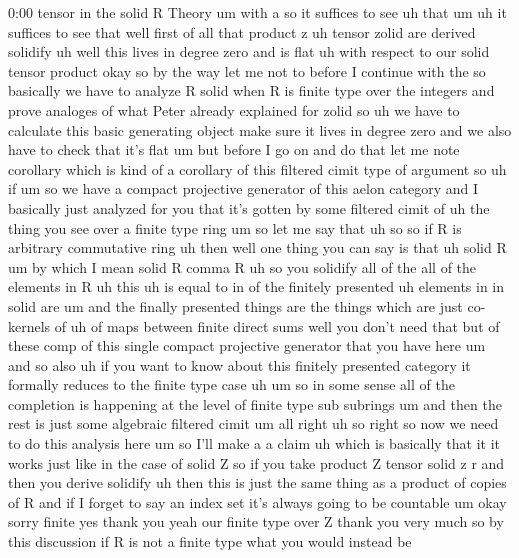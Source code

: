 \begin{unfinished}{0:00}
tensor  in  the  solid  R  Theory  um  with
a  so  it  suffices  to
see  uh  that
um  uh  it  suffices  to  see  that  well  first
of  all  that  product  z  uh  tensor  zolid
are  derived
solidify  uh  well  this  lives  in  degree
zero  and  is
flat  uh  with  respect  to  our  solid  tensor
product
okay
so  by  the  way  let  me  not  to  before  I
continue  with  the  so  basically  we  have
to  analyze  R  solid  when  R  is  finite  type
over  the  integers  and  prove  analoges  of
what  Peter  already  explained  for  zolid
so  uh  we  have  to  calculate  this  basic
generating  object  make  sure  it  lives  in
degree  zero  and  we  also  have  to  check
that  it's  flat  um  but  before  I  go  on  and
do  that  let  me  note  corollary  which  is
kind  of  a  corollary  of  this  filtered
cimit  type  of  argument  so  uh  if  um  so  we
have  a  compact  projective  generator  of
this  aelon  category  and  I  basically  just
analyzed  for  you  that  it's  gotten  by
some  filtered  cimit  of  uh  the  thing  you
see  over  a  finite  type  ring  um  so  let  me
say  that  uh  so  so  if  R  is
arbitrary  commutative  ring
uh  then  well  one  thing  you  can  say  is
that  uh  solid
R  um  by  which  I  mean  solid  R  comma
R  uh  so  you  solidify  all  of  the  all  of
the  elements  in  R  uh  this  uh  is  equal  to
in  of  the  finitely  presented
uh  elements  in  in  solid  are  um  and  the
finally  presented  things  are  the  things
which  are  just  co-  kernels  of  uh  of  maps
between  finite  direct  sums  well  you
don't  need  that  but  of  these  comp  of
this  single  compact  projective  generator
that  you  have  here  um  and  so
also  uh  if  you  want  to  know  about  this
finitely  presented  category  it  formally
reduces  to  the  finite  type
case  uh
um  so  in  some  sense  all  of  the
completion  is  happening  at  the  level  of
finite  type  sub
subrings
um  and  then  the  rest  is  just  some
algebraic  filtered  cimit
um  all
right  uh  so  right  so  now  we  need  to  do
this  analysis
here
um  so  I'll  make  a  a
claim  uh  which  is  basically  that  it  it
works  just  like  in  the  case  of  solid  Z
so  if  you  take  product  Z  tensor  solid  z
r  and  then  you  derive
solidify  uh  then  this  is  just  the  same
thing  as  a  product  of  copies  of  R  and  if
I  forget  to  say  an  index  set  it's  always
going  to  be  countable
um
okay  sorry  finite  yes  thank  you  yeah  our
finite  type  over  Z  thank  you  very  much
so  by  this  discussion  if  R  is  not  a
finite  type  what  you  would  instead  be

\end{unfinished}
